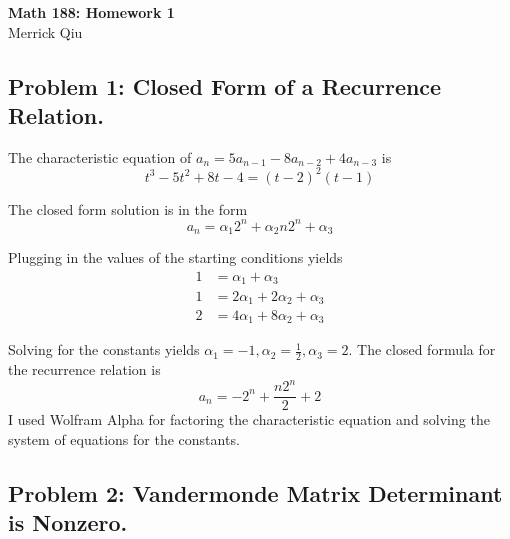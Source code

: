 \documentclass{report}
\begin{document}
\begin{center}
	\huge{\bf Math 188: Homework 1} \\
	Merrick Qiu
\end{center}

\subsection*{Problem 1: Closed Form of a Recurrence Relation.}

The characteristic equation of $a_n = 5a_{n-1}-8a_{n-2}+4a_{n-3}$ is 
\[
    t^3-5t^2+8t-4 = (t-2)^2(t-1) 
\]

The closed form solution is in the form 
\[
    a_n = \alpha_1 2^n + \alpha_2 n 2^n + \alpha_3
\]

Plugging in the values of the starting conditions yields
\begin{align*}
    1 &= \alpha_1 + \alpha_3 \\
    1 &= 2\alpha_1 + 2\alpha_2 + \alpha_3 \\
    2 &= 4\alpha_1 + 8\alpha_2 + \alpha_3
\end{align*}

Solving for the constants yields 
$\alpha_1 = -1, \alpha_2 = \frac{1}{2}, \alpha_3 = 2$.
The closed formula for the recurrence relation is
\[
    a_n = -2^n + \frac{n2^n}{2} + 2
\]
I used Wolfram Alpha for factoring the characteristic equation
and solving the system of equations for the constants.
\newpage

\subsection*{Problem 2: Vandermonde Matrix Determinant is Nonzero.}
\end{document}
